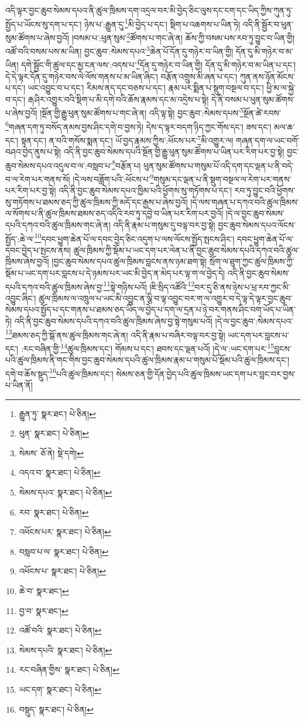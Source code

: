 འདི་ལྟར་བྱང་ཆུབ་སེམས་དཔའ་ནི་ཚུལ་ཁྲིམས་དག་འདྲལ་བར་མི་བྱེད་ཅིང་ལུས་དང་ངག་དང་ཡིད་ཀྱིས་ཀུན་ཏུ་སྤྱོད་པ་ཡོངས་སུ་དག་པ་དང་། ཉེས་པ་:རྒྱུན་དུ་\footnote{རྒྱུན་ཏུ་  སྣར་ཐང་།  པེ་ཅིན། }མི་བྱེད་པ་དང་། སྡིག་པ་འཆགས་པ་ཡིན་ཏེ། འདི་ནི་སྦྱོར་བ་ཕུན་སུམ་ཚོགས་པ་ཞེས་བྱའོ། །བསམ་པ་:ཕུན་སུམ་\footnote{ཕུན་  སྣར་ཐང་།  པེ་ཅིན། }ཚོགས་པ་གང་ཞེ་ན། ཆོས་ཀྱི་བསམ་པས་རབ་ཏུ་བྱུང་བ་ཡིན་གྱི། འཚོ་བའི་བསམ་པས་མ་ཡིན། བྱང་ཆུབ་:སེམས་དཔའ་\footnote{སེམས་  ཅོ་ནེ།  སྡེ་དགེ། }ཆེན་པོ་དོན་དུ་གཉེར་བ་ཡིན་གྱི། དོན་དུ་མི་གཉེར་བ་མ་ཡིན། དགེ་སྦྱོང་གི་ཚུལ་དང་མྱ་ངན་ལས་:འདས་པ་\footnote{འདའ་བ་  སྣར་ཐང་།  པེ་ཅིན། }དོན་དུ་གཉེར་བ་ཡིན་གྱི། དོན་དུ་མི་གཉེར་བ་མ་ཡིན་པ་དང་། དེ་དེ་ལྟར་དོན་དུ་གཉེར་བས་ལེ་ལོས་གནས་པ་མ་ཡིན་ཞིང་། བརྩོན་འགྲུས་མི་ཞན་པ་དང་། ཀུན་ནས་ཉོན་མོངས་པ་དང་། ཡང་འབྱུང་བ་པ་དང་། རིམས་ནད་དང་བཅས་པ་དང་། རྣམ་པར་སྨིན་པ་སྡུག་བསྔལ་བ་དང་། ཕྱི་མ་ལ་སྐྱེ་བ་དང་། རྒ་ཤིར་འགྱུར་བའི་སྡིག་པ་མི་དགེ་བའི་ཆོས་རྣམས་དང་མ་འདྲེས་པ་སྟེ། དེ་ནི་བསམ་པ་ཕུན་སུམ་ཚོགས་པ་ཞེས་བྱའོ། །སྔོན་གྱི་རྒྱུ་ཕུན་སུམ་ཚོགས་པ་གང་ཞེ་ན། འདི་ལྟ་སྟེ། བྱང་ཆུབ་:སེམས་དཔས་\footnote{སེམས་དཔའ་  སྣར་ཐང་།  པེ་ཅིན། }སྔོན་ཚེ་རབས་\footnote{རབ་  སྣར་ཐང་།  པེ་ཅིན། }གཞན་དག་ཏུ་བསོད་ནམས་བྱས་ཤིང་དགེ་བ་བྱས་ཏེ། དེས་ད་ལྟར་བདག་ཉིད་ཀྱང་གོས་དང་། ཟས་དང་། མལ་ཆ་དང་། སྟན་དང་། ན་བའི་གསོས་སྨན་དང་། ཡོ་བྱད་རྣམས་ཀྱིས་:ཕོངས་པར་\footnote{འཕོངས་པར་  སྣར་ཐང་།  པེ་ཅིན། }མི་འགྱུར་ལ། གཞན་དག་ལ་ཡང་བགོ་བཤའ་བྱེད་ནུས་པ་སྟེ། འདི་ནི་བྱང་ཆུབ་སེམས་དཔའི་སྔོན་གྱི་རྒྱུ་ཕུན་སུམ་ཚོགས་པ་ཡིན་པར་རིག་པར་བྱ་སྟེ། བྱང་ཆུབ་སེམས་དཔའ་འདུལ་བ་ལ་:བསླབ་པ་\footnote{བསླབ་པ་ལ་  སྣར་ཐང་།  པེ་ཅིན། }བརྩོན་པ། ཕུན་སུམ་ཚོགས་པ་གསུམ་པོ་འདི་དག་དང་ལྡན་པ་ནི་བདེ་བ་ལ་རེག་པར་གནས་སོ། །དེ་ལས་བཟློག་པའི་:ཕོངས་པ་\footnote{འཕོངས་པ་  སྣར་ཐང་།  པེ་ཅིན། }གསུམ་དང་ལྡན་པ་ནི་སྡུག་བསྔལ་ལ་རེག་པར་གནས་པར་རིག་པར་བྱ་སྟེ། འདི་ནི་བྱང་ཆུབ་སེམས་དཔའ་ཁྱིམ་པའི་ཕྱོགས་སུ་གཏོགས་པ་དང་། རབ་ཏུ་བྱུང་བའི་ཕྱོགས་སུ་གཏོགས་པ་ཐམས་ཅད་ཀྱི་ཚུལ་ཁྲིམས་ཀྱི་མདོ་དང་རྒྱས་པ་ཞེས་བྱའོ། །དེ་ལས་གཞན་པ་དཀའ་བའི་ཚུལ་ཁྲིམས་ལ་སོགས་པ་ནི་ཚུལ་ཁྲིམས་ཐམས་ཅད་འདིའི་རབ་ཏུ་དབྱེ་བ་ཡིན་པར་རིག་པར་བྱའོ། །དེ་ལ་བྱང་ཆུབ་སེམས་དཔའི་དཀའ་བའི་ཚུལ་ཁྲིམས་གང་ཞེ་ན། འདི་ནི་རྣམ་པ་གསུམ་དུ་བལྟ་བར་བྱ་སྟེ། བྱང་ཆུབ་སེམས་དཔའ་ལོངས་སྤྱོད་:ཆེ་ལ་\footnote{ཆེ་བ་  སྣར་ཐང་། }དབང་ཕྱུག་ཆེན་པོ་ལ་དབང་བྱེད་ཅིང་འདུག་པ་ལས་ལོངས་སྤྱོད་སྤངས་ཤིང་། དབང་ཕྱུག་ཆེན་པོ་ལ་དབང་བྱེད་པ་སྤངས་ནས། ཚུལ་ཁྲིམས་ཀྱི་སྡོམ་པ་ཡང་དག་པར་ལེན་པ་ནི་བྱང་ཆུབ་སེམས་དཔའི་དཀའ་བའི་ཚུལ་ཁྲིམས་ཞེས་བྱའོ། །བྱང་ཆུབ་སེམས་དཔའ་ཚུལ་ཁྲིམས་བླངས་ནས་ཉམ་ཐག་སྟེ། སྲོག་ལ་ཐུག་ཀྱང་ཚུལ་ཁྲིམས་ཀྱི་སྡོམ་པ་ཡང་དག་པར་བླངས་པ་དེ་ཉམས་པར་ཡང་མི་བྱེད་ན་མེད་པར་ལྟ་ག་ལ་བྱེད་དེ། འདི་ནི་བྱང་ཆུབ་སེམས་དཔའི་དཀའ་བའི་ཚུལ་ཁྲིམས་ཞེས་བྱ་\footnote{བྱ་བ་  སྣར་ཐང་། }སྟེ་གཉིས་པའོ། །ཇི་སྲིད་འཚོའི་\footnote{འཚོ་བའི་  སྣར་ཐང་།  པེ་ཅིན། }བར་དུ་ཅི་ནས་ཉེས་པ་ཕྲ་རབ་ཀྱང་མི་འབྱུང་ཞིང་། ཚུལ་ཁྲིམས་ལ་འཁྲུལ་པ་ཡང་མི་འབྱུང་ན་ལྕི་བ་ལྟ་འབྱུང་བར་ག་ལ་འགྱུར་བ་དེ་ལྟ་དེ་ལྟར་བྱང་ཆུབ་སེམས་དཔའ་སྤྱོད་པ་དང་གནས་པ་ཐམས་ཅད་ཡིད་ལ་བྱེད་པ་དག་ལ་དྲན་པ་ཉེ་བར་གནས་ཤིང་བག་ཡོད་པ་ཡིན་ཏེ། འདི་ནི་བྱང་ཆུབ་སེམས་དཔའི་དཀའ་བའི་ཚུལ་ཁྲིམས་ཞེས་བྱ་སྟེ་གསུམ་པའོ། །དེ་ལ་བྱང་ཆུབ་:སེམས་དཔའ་\footnote{སེམས་དཔའི་  སྣར་ཐང་།  པེ་ཅིན། }ཐམས་ཅད་ཀྱི་སྒོ་ནས་ཚུལ་ཁྲིམས་གང་ཞེ་ན། འདི་ནི་རྣམ་པ་བཞིར་བལྟ་བར་བྱ་སྟེ། ཡང་དག་པར་བླངས་པ་དང་། :རང་བཞིན་གྱི་\footnote{རང་བཞིན་གྱིས་  སྣར་ཐང་།  པེ་ཅིན། }ཚུལ་ཁྲིམས་དང་། གོམས་པ་དང་། ཐབས་དང་ལྡན་པའོ། །དེ་ལ་:ཡང་དག་པར་\footnote{ཡང་དག་  སྣར་ཐང་།  པེ་ཅིན། }བླངས་པའི་ཚུལ་ཁྲིམས་ནི་གང་གིས་བྱང་ཆུབ་སེམས་དཔའི་ཚུལ་ཁྲིམས་རྣམ་པ་གསུམ་པོ་སྡོམ་པའི་ཚུལ་ཁྲིམས་དང་། དགེ་བ་ཆོས་སྡུད་\footnote{བསྡུད་  སྣར་ཐང་།  པེ་ཅིན། }པའི་ཚུལ་ཁྲིམས་དང་། སེམས་ཅན་གྱི་དོན་བྱེད་པའི་ཚུལ་ཁྲིམས་ཡང་དག་པར་བླང་བར་བྱས་པ་ཡིན་ནོ། 
